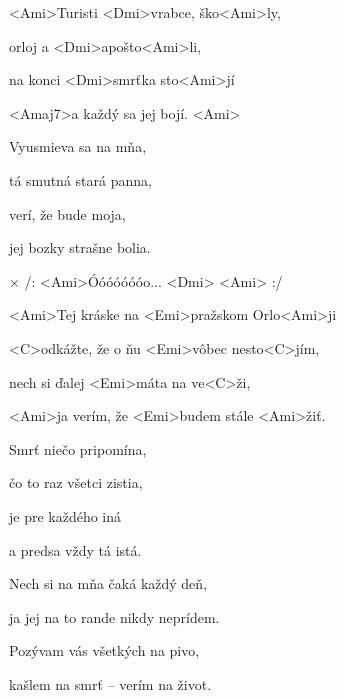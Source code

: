
\zs
<Ami>Turisti <Dmi>vrabce, ško<Ami>ly,

orloj a <Dmi>apošto<Ami>li,

na konci <Dmi>smrťka sto<Ami>jí

<Amaj7>a každý sa jej bojí. <Ami>
\ks

\zs
Vyusmieva sa na mňa,

tá smutná stará panna,

verí, že bude moja,

jej bozky strašne bolia.
\ks

× /: <Ami>Óóóóóóóo... <Dmi> <Ami> :/

<Ami>Tej kráske na <Emi>pražskom Orlo<Ami>ji

<C>odkážte, že o ňu <Emi>vôbec nesto<C>jím,

nech si ďalej <Emi>máta na ve<C>ži,

<Ami>ja verím, že <Emi>budem stále <Ami>žiť.
\kr

\zs
Smrť niečo pripomína,

čo to raz všetci zistia,

je pre každého iná

a predsa vždy tá istá.
\ks

\zr \kr

\zr
Nech si na mňa čaká každý deň,

ja jej na to rande nikdy neprídem.

Pozývam vás všetkých na pivo,

kašlem na smrť -- verím na život.
\kr

\kp
